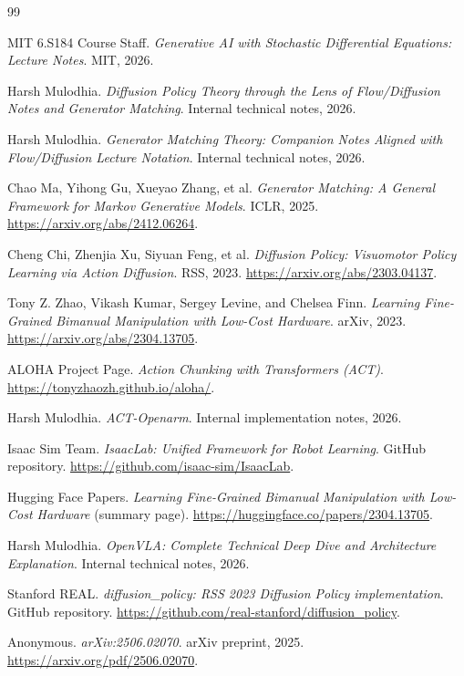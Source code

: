 \documentclass[
]{article}
\theoremstyle{remark}
\begin{document}
\begin{thebibliography}{99}

 MIT 6.S184 Course Staff. \textit{Generative AI with Stochastic Differential Equations: Lecture Notes}. MIT, 2026.

 Harsh Mulodhia. \textit{Diffusion Policy Theory through the Lens of Flow/Diffusion Notes and Generator Matching}. Internal technical notes, 2026.

 Harsh Mulodhia. \textit{Generator Matching Theory: Companion Notes Aligned with Flow/Diffusion Lecture Notation}. Internal technical notes, 2026.

 Chao Ma, Yihong Gu, Xueyao Zhang, et al. \textit{Generator Matching: A General Framework for Markov Generative Models}. ICLR, 2025. \url{https://arxiv.org/abs/2412.06264}.

 Cheng Chi, Zhenjia Xu, Siyuan Feng, et al. \textit{Diffusion Policy: Visuomotor Policy Learning via Action Diffusion}. RSS, 2023. \url{https://arxiv.org/abs/2303.04137}.

 Tony Z. Zhao, Vikash Kumar, Sergey Levine, and Chelsea Finn. \textit{Learning Fine-Grained Bimanual Manipulation with Low-Cost Hardware}. arXiv, 2023. \url{https://arxiv.org/abs/2304.13705}.

 ALOHA Project Page. \textit{Action Chunking with Transformers (ACT)}. \url{https://tonyzhaozh.github.io/aloha/}.

 Harsh Mulodhia. \textit{ACT-Openarm}. Internal implementation notes, 2026.

 Isaac Sim Team. \textit{IsaacLab: Unified Framework for Robot Learning}. GitHub repository. \url{https://github.com/isaac-sim/IsaacLab}.

 Hugging Face Papers. \textit{Learning Fine-Grained Bimanual Manipulation with Low-Cost Hardware} (summary page). \url{https://huggingface.co/papers/2304.13705}.

 Harsh Mulodhia. \textit{OpenVLA: Complete Technical Deep Dive and Architecture Explanation}. Internal technical notes, 2026.

 Stanford REAL. \textit{diffusion\_policy: RSS 2023 Diffusion Policy implementation}. GitHub repository. \url{https://github.com/real-stanford/diffusion_policy}.

 Anonymous. \textit{arXiv:2506.02070}. arXiv preprint, 2025. \url{https://arxiv.org/pdf/2506.02070}.

\end{thebibliography}
\end{document}
